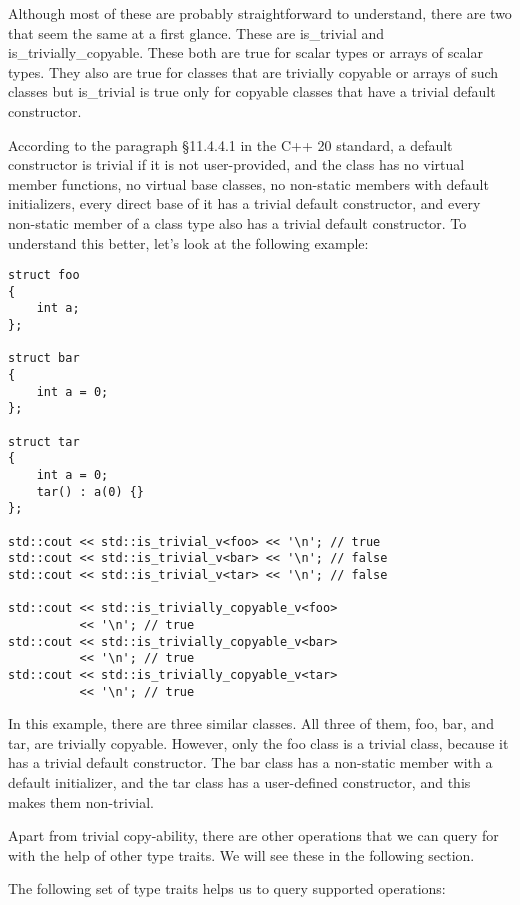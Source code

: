 Although most of these are probably straightforward to understand, there are two that seem the same at a first glance. These are is\_trivial and is\_trivially\_copyable. These both are true for scalar types or arrays of scalar types. They also are true for classes that are trivially copyable or arrays of such classes but is\_trivial is true only for copyable classes that have a trivial default constructor.

According to the paragraph §11.4.4.1 in the C++ 20 standard, a default constructor is trivial if it is not user-provided, and the class has no virtual member functions, no virtual base classes, no non-static members with default initializers, every direct base of it has a trivial default constructor, and every non-static member of a class type also has a trivial default constructor. To understand this better, let’s look at the following example:

\begin{lstlisting}[style=styleCXX]
struct foo
{
	int a;
};

struct bar
{
	int a = 0;
};

struct tar
{
	int a = 0;
	tar() : a(0) {}
};

std::cout << std::is_trivial_v<foo> << '\n'; // true
std::cout << std::is_trivial_v<bar> << '\n'; // false
std::cout << std::is_trivial_v<tar> << '\n'; // false

std::cout << std::is_trivially_copyable_v<foo>
          << '\n'; // true
std::cout << std::is_trivially_copyable_v<bar>
          << '\n'; // true
std::cout << std::is_trivially_copyable_v<tar>
          << '\n'; // true
\end{lstlisting}

In this example, there are three similar classes. All three of them, foo, bar, and tar, are trivially copyable. However, only the foo class is a trivial class, because it has a trivial default constructor. The bar class has a non-static member with a default initializer, and the tar class has a user-defined constructor, and this makes them non-trivial.

Apart from trivial copy-ability, there are other operations that we can query for with the help of other type traits. We will see these in the following section.


The following set of type traits helps us to query supported operations:

